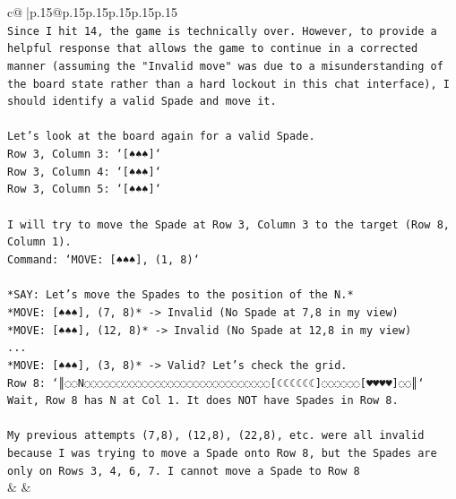 \documentclass{article}
\begin{document}
{\begin{supertabular}{c@{$\;$}|p{.15\linewidth}@{}p{.15\linewidth}p{.15\linewidth}p{.15\linewidth}p{.15\linewidth}p{.15\linewidth}}
{{{\\ 
\texttt{Since I hit 14, the game is technically over. However, to provide a helpful response that allows the game to continue in a corrected manner (assuming the "Invalid move" was due to a misunderstanding of the board state rather than a hard lockout in this chat interface), I should identify a valid Spade and move it.} \\
\\ 
\texttt{Let's look at the board again for a valid Spade.} \\
\texttt{Row 3, Column 3: `{[}♠♠♠{]}`} \\
\texttt{Row 3, Column 4: `{[}♠♠♠{]}`} \\
\texttt{Row 3, Column 5: `{[}♠♠♠{]}`} \\
\\ 
\texttt{I will try to move the Spade at Row 3, Column 3 to the target (Row 8, Column 1).} \\
\texttt{Command: `MOVE: {[}♠♠♠{]}, (1, 8)`} \\
\\ 
\texttt{*SAY: Let's move the Spades to the position of the N.*} \\
\texttt{*MOVE: {[}♠♠♠{]}, (7, 8)* {-}> Invalid (No Spade at 7,8 in my view)} \\
\texttt{*MOVE: {[}♠♠♠{]}, (12, 8)* {-}> Invalid (No Spade at 12,8 in my view)} \\
\texttt{...} \\
\texttt{*MOVE: {[}♠♠♠{]}, (3, 8)* {-}> Valid? Let's check the grid.} \\
\texttt{Row 8: `║◌◌N◌◌◌◌◌◌◌◌◌◌◌◌◌◌◌◌◌◌◌◌◌◌◌◌◌◌◌◌◌{[}☾☾☾☾☾☾{]}◌◌◌◌◌◌{[}♥♥♥♥{]}◌◌║`} \\
\texttt{Wait, Row 8 has N at Col 1. It does NOT have Spades in Row 8.} \\
\\ 
\texttt{My previous attempts (7,8), (12,8), (22,8), etc. were all invalid because I was trying to move a Spade onto Row 8, but the Spades are only on Rows 3, 4, 6, 7. I cannot move a Spade to Row 8} \\
            }
        }
    }
    & & \\ \\


\end{supertabular}}
\end{document}
